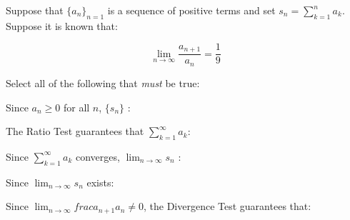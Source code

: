 \documentclass{ximera}
\author{Jim Talamo}
\begin{document}
\begin{exercise}
Suppose that $\{a_n\}_{n=1}$ is a sequence of positive terms and set $s_n = \sum_{k=1}^n a_k$.  Suppose it is known that:

\[
\lim_{n \to \infty} \frac{a_{n+1}}{a_n} = \frac{1}{9}
\]


Select all of the following that \emph{must} be true:

\begin{selectAll}
\end{selectAll}

\begin{hint}
Since $a_n \geq 0$ for all $n$, $\{s_n\}$ :
\begin{multipleChoice}
\end{multipleChoice}

The Ratio Test guarantees that $\sum_{k=1}^{\infty} a_k$:

\begin{multipleChoice}
\end{multipleChoice}


\begin{question}

Since $\sum_{k=1}^{\infty} a_k$ converges, $\lim_{n \to \infty} s_n$ :
\begin{multipleChoice}
\end{multipleChoice}

\begin{question}
Since $\lim_{n \to \infty} s_n$ exists:
\begin{multipleChoice}
\end{multipleChoice}

\end{question}
\end{question}

Since $\lim_{n \to \infty} frac{a_{n+1}}{a_n} \neq 0$, the Divergence Test guarantees that:

\begin{multipleChoice}
\end{multipleChoice}

\end{hint}

\end{exercise}
\end{document}
